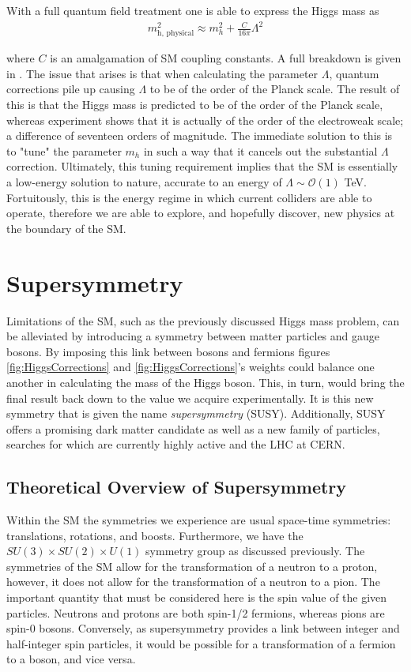 \noindent With a full quantum field treatment one is able to express the Higgs mass as
\begin{align}
m_{\textrm{h, physical}}^{2} \approx m_{h}^{2} + \frac{C}{16 \pi} \Lambda^{2}
\end{align}

where $C$ is an amalgamation of SM coupling constants.
A full breakdown is given in \cite{baer2015supergravity}.
The issue that arises is that when calculating the parameter $\Lambda$, quantum corrections pile up causing $\Lambda$ to be of the order of the Planck scale.
The result of this is that the Higgs mass is predicted to be of the order of the Planck scale, whereas experiment shows that it is actually of the order of the electroweak scale; a difference of seventeen orders of magnitude.
The immediate solution to this is to "tune" the parameter $m_{h}$ in such a way that it cancels out the substantial $\Lambda$ correction.
Ultimately, this tuning requirement implies that the SM is essentially a low-energy solution to nature,  accurate to an energy of $\Lambda \sim \mathcal{O}(1)$ TeV.
Fortuitously, this is the energy regime in which current colliders are able to operate, therefore we are able to explore, and hopefully discover, new physics at the boundary of the SM.

\section{Supersymmetry}
Limitations of the SM, such as the previously discussed Higgs mass problem, can be alleviated by introducing a symmetry between matter particles and gauge bosons.
By imposing this link between bosons and fermions figures \ref{fig:HiggsCorrections} and \ref{fig:HiggsCorrections}'s weights could balance one another in calculating the mass of the Higgs boson. 
This, in turn, would bring the final result back down to the value we acquire experimentally.
It is this new symmetry that is given the name \textit{supersymmetry} (SUSY).
Additionally, SUSY offers a promising dark matter candidate as well as a new family of particles, searches for which are currently highly active and the LHC at CERN.

\subsection{Theoretical Overview of Supersymmetry}
Within the SM the symmetries we experience are usual space-time symmetries: translations, rotations, and boosts.
Furthermore, we have the $SU(3) \times SU(2) \times U(1)$ symmetry group as discussed previously.
The symmetries of the SM allow for the transformation of a neutron to a proton, however, it does not allow for the transformation of a neutron to a pion.
The important quantity that must be considered here is the spin value of the given particles.
Neutrons and protons are both spin-1/2 fermions, whereas pions are spin-0 bosons.
Conversely, as supersymmetry provides a link between integer and half-integer spin particles, it would be possible for a transformation of a fermion to a boson, and vice versa.

